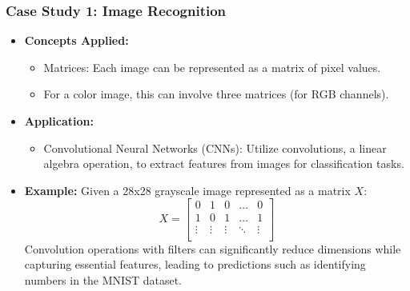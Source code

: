 \documentclass{beamer}
\begin{document}
\begin{frame}[fragile]
    \frametitle{Case Study 1: Image Recognition}
    \begin{itemize}
        \item \textbf{Concepts Applied:}
            \begin{itemize}
                \item Matrices: Each image can be represented as a matrix of pixel values.
                \item For a color image, this can involve three matrices (for RGB channels).
            \end{itemize}

        \item \textbf{Application:}
            \begin{itemize}
                \item Convolutional Neural Networks (CNNs): Utilize convolutions, a linear algebra operation, to extract features from images for classification tasks.
            \end{itemize}

        \item \textbf{Example:}
            Given a 28x28 grayscale image represented as a matrix \( X \):
            \begin{equation}
              X = 
              \begin{bmatrix}
              0 & 1 & 0 & \dots & 0 \\
              1 & 0 & 1 & \dots & 1 \\
              \vdots & \vdots & \vdots & \ddots & \vdots \\
              \end{bmatrix}
            \end{equation}
            Convolution operations with filters can significantly reduce dimensions while capturing essential features, leading to predictions such as identifying numbers in the MNIST dataset.
    \end{itemize}
\end{frame}
\end{document}
